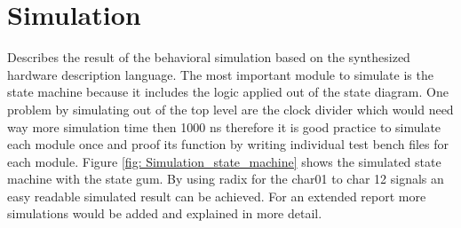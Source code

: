 \section{Simulation} \label{sec: Simulation}
Describes the result of the behavioral simulation based on the synthesized hardware description language.
The most important module to simulate is the state machine because it includes the logic applied out of the state diagram. 
One problem by simulating out of the top level are the clock divider which would need way more simulation time then 1000 ns therefore it is good practice to simulate each module once and proof its function by writing individual test bench files for each module.
Figure \ref{fig: Simulation_state_machine} shows the simulated state machine with the state gum. By using radix for the char01 to char 12 signals an easy readable simulated result can be achieved.
For an extended report more simulations would be added and explained in more detail.

